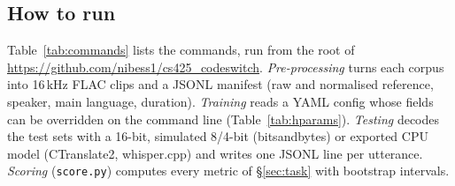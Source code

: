 \subsection{How to run}\label{app:run}
Table~\ref{tab:commands} lists the commands, run from the root of \url{https://github.com/nibess1/cs425_codeswitch}. \emph{Pre-processing} turns each corpus into 16\,kHz FLAC clips and a JSONL manifest (raw and normalised reference, speaker, main language, duration). \emph{Training} reads a YAML config whose fields can be overridden on the command line (Table~\ref{tab:hparams}). \emph{Testing} decodes the test sets with a 16-bit, simulated 8/4-bit (bitsandbytes) or exported CPU model (CTranslate2, whisper.cpp) and writes one JSONL line per utterance. \emph{Scoring} (\texttt{score.py}) computes every metric of \S\ref{sec:task} with bootstrap intervals.


